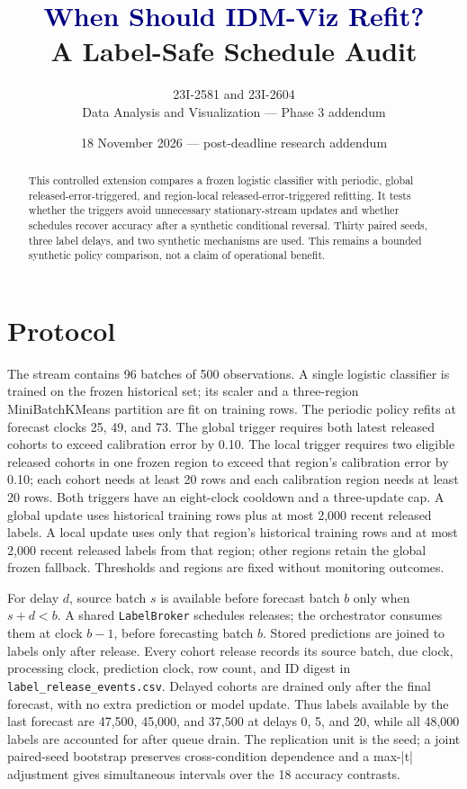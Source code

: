 \documentclass[10pt]{article}
\title{\textcolor{navy}{When Should IDM-Viz Refit?}\\[3pt]\large A Label-Safe Schedule Audit}
\author{23I-2581 and 23I-2604\\Data Analysis and Visualization --- Phase 3 addendum}
\date{18 November 2026 --- post-deadline research addendum}
\begin{document}
\maketitle
\begin{abstract}
This controlled extension compares a frozen logistic classifier with periodic, global released-error-triggered, and region-local released-error-triggered refitting. It tests whether the triggers avoid unnecessary stationary-stream updates and whether schedules recover accuracy after a synthetic conditional reversal. Thirty paired seeds, three label delays, and two synthetic mechanisms are used. This remains a bounded synthetic policy comparison, not a claim of operational benefit.
\end{abstract}
\section{Protocol}
The stream contains 96 batches of 500 observations. A single logistic classifier is trained on the frozen historical set; its scaler and a three-region MiniBatchKMeans partition are fit on training rows. The periodic policy refits at forecast clocks 25, 49, and 73. The global trigger requires both latest released cohorts to exceed calibration error by 0.10. The local trigger requires two eligible released cohorts in one frozen region to exceed that region's calibration error by 0.10; each cohort needs at least 20 rows and each calibration region needs at least 20 rows. Both triggers have an eight-clock cooldown and a three-update cap. A global update uses historical training rows plus at most 2,000 recent released labels. A local update uses only that region's historical training rows and at most 2,000 recent released labels from that region; other regions retain the global frozen fallback. Thresholds and regions are fixed without monitoring outcomes.

For delay $d$, source batch $s$ is available before forecast batch $b$ only when $s+d<b$. A shared \texttt{LabelBroker} schedules releases; the orchestrator consumes them at clock $b-1$, before forecasting batch $b$. Stored predictions are joined to labels only after release. Every cohort release records its source batch, due clock, processing clock, prediction clock, row count, and ID digest in \texttt{label\_release\_events.csv}. Delayed cohorts are drained only after the final forecast, with no extra prediction or model update. Thus labels available by the last forecast are 47,500, 45,000, and 37,500 at delays 0, 5, and 20, while all 48,000 labels are accounted for after queue drain. The replication unit is the seed; a joint paired-seed bootstrap preserves cross-condition dependence and a max-|t| adjustment gives simultaneous intervals over the 18 accuracy contrasts.
\end{document}
